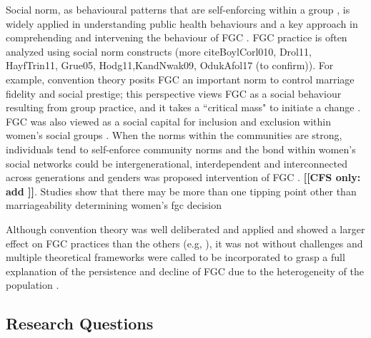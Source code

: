\documentclass[12pt,]{article}
\newcommand{\comment}[1]{\textbf{[[#1]]}}
\newcommand{\cfonly}[1]{\comment{CFS only: #1}}
\begin{document}
Social norm, as behavioural patterns that are self-enforcing within a group \cite{Youn15}, is widely applied in understanding public health behaviours \cite{Ajze91, Ajze02, CislHeis18a,MollRima10, RimaLapi15} and a key approach in comprehending and intervening the behaviour of FGC \cite{Bicc10, BiccMari15, Mack96, Mack00, MackLeJe08, RimaLapi15, Youn11, UNIC10, UNIC13}.  FGC practice is often analyzed using social norm constructs \cite{DuncWand11, EffeVogt15, Hayf05, Youn02, } (more cite{BoylCorl010, Drol11, HayfTrin11, Grue05, Hodg11,KandNwak09, OdukAfol17} (to confirm)).  For example, convention theory posits FGC an important norm to control marriage fidelity and social prestige; this perspective views FGC as a social behaviour resulting from group practice, and it takes a ``critical mass" to initiate a change \cite{Mack00, MackLeJe08}.  FGC was also viewed as a social capital for inclusion and exclusion within women’s social groups \cite{Shel-Wand11}.  When the norms within the communities are strong, individuals tend to self-enforce community norms \cite{Ajze02, Hayf05, KandNwak09, KandShel19, Mack96, Mack06, MackLeJe08, ThomMadd92} and the bond within women's social networks could be intergenerational, interdependent and interconnected across generations and genders was proposed intervention of FGC  \cite{Mack00, DuncWand11, ShelWand11}. \cfonly{add \cite{Bicc15}}.  Studies show that there may be more than one tipping point other than marriageability determining women’s fgc decision \cite{AlcaGonz13, BellNova15, EffeVogt15, Hayf05, Mack09, PashPonn16, Rima08, ShelWand11, more?}

Although convention theory was well deliberated and applied and showed a larger effect on FGC practices than the others (e.g, \cite{BoylMcMo02, BoylCorl10, FreyJohn07, FrieMahm13, Hayf05, KandMwek09, Mack96, Mack06, ReigGonz14, YirgKass12}),  it was not without challenges \cite{EffeVogt15} and multiple theoretical frameworks were called to be incorporated to grasp a full explanation of the persistence and decline of FGC due to the heterogeneity of the population \cite{EffeVogt15, ModrLiu13}.  



\subsection{Research Questions}\label{research-questions}
\end{document}
